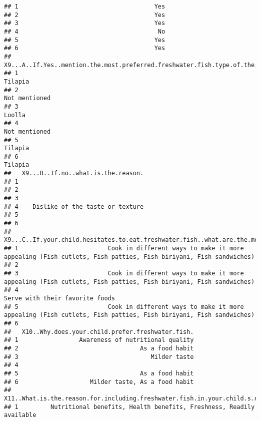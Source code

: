 \documentclass[
]{article}
\begin{document}
\begin{verbatim}
## 1                                      Yes
## 2                                      Yes
## 3                                      Yes
## 4                                       No
## 5                                      Yes
## 6                                      Yes
##   X9...A..If.Yes..mention.the.most.preferred.freshwater.fish.type.of.the.child.
## 1                                                                       Tilapia
## 2                                                                 Not mentioned
## 3                                                                        Loolla
## 4                                                                 Not mentioned
## 5                                                                      Tilapia 
## 6                                                                      Tilapia 
##   X9...B..If.no..what.is.the.reason.
## 1                                   
## 2                                   
## 3                                   
## 4    Dislike of the taste or texture
## 5                                   
## 6                                   
##   X9...C..If.your.child.hesitates.to.eat.freshwater.fish..what.are.the.methods.you.used.to.encourage.improve.their.consumption.usually.
## 1                         Cook in different ways to make it more appealing (Fish cutlets, Fish patties, Fish biriyani, Fish sandwiches)
## 2                                                                                                                                      
## 3                         Cook in different ways to make it more appealing (Fish cutlets, Fish patties, Fish biriyani, Fish sandwiches)
## 4                                                                                                       Serve with their favorite foods
## 5                         Cook in different ways to make it more appealing (Fish cutlets, Fish patties, Fish biriyani, Fish sandwiches)
## 6                                                                                                                                      
##   X10..Why.does.your.child.prefer.freshwater.fish.
## 1                 Awareness of nutritional quality
## 2                                  As a food habit
## 3                                     Milder taste
## 4                                                 
## 5                                  As a food habit
## 6                    Milder taste, As a food habit
##   X11..What.is.the.reason.for.including.freshwater.fish.in.your.child.s.diet.
## 1         Nutritional benefits, Health benefits, Freshness, Readily available

\end{verbatim}
\end{document}
